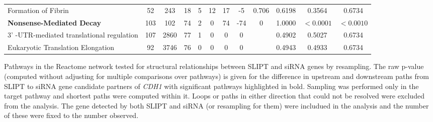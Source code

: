 \begin{table*}[!htb]
{{\begin{threeparttable}
\begin{tabular}{l|cc|cc|cccc|cc|c}
\rowcolor{black!10}
Formation of Fibrin                       & 52          & 243          & 18            & 5           & 12   & 17   & -5      & 0.706        & 0.6198             & 0.3564    & 0.6734            \\
\rowcolor{black!5}
\textbf{Nonsense-Mediated Decay}                   & 103         & 102          & 74            & 2           & 0    & 74   & -74     & 0            & 1.0000             & $<0.0001$  & $<0.0010$                \\
\rowcolor{black!10}
3' -UTR-mediated translational regulation & 107         & 2860         & 77            & 1           & 0    & 0    & 0       &              & 0.4902             & 0.5027   & 0.6734             \\
\rowcolor{black!5}
Eukaryotic Translation Elongation         & 92          & 3746         & 76            & 0           & 0    & 0    & 0       &              & 0.4943             & 0.4933   & 0.6734             \\
\hline
\end{tabular}
\begin{tablenotes}
\raggedright \small
Pathways in the Reactome network tested for structural relationships between \gls{SLIPT} and \gls{siRNA} genes by resampling. The raw p-value (computed without adjusting for multiple comparisons over \glspl{pathway}) is given for the difference in upstream and downstream paths from \gls{SLIPT} to \gls{siRNA} gene candidate partners of \textit{CDH1} with significant \glspl{pathway} highlighted in bold. Sampling was performed only in the target \gls{pathway} and \glspl{shortest path} were computed within it. Loops or paths in either direction that could not be resolved were excluded from the analysis. The gene detected by both \gls{SLIPT} and \gls{siRNA} (or resampling for them) were includued in the analysis and the number of these were fixed to the number observed.
\end{tablenotes}
\end{threeparttable}
}
}
\end{table*}

